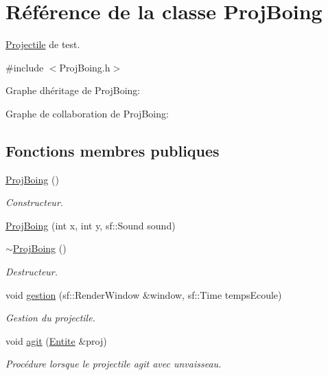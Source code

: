 \hypertarget{class_proj_boing}{}\section{Référence de la classe Proj\+Boing}
\label{class_proj_boing}


\hyperlink{class_projectile}{Projectile} de test.  




{\ttfamily \#include $<$Proj\+Boing.\+h$>$}



Graphe d\textquotesingle{}héritage de Proj\+Boing\+:


Graphe de collaboration de Proj\+Boing\+:
\subsection*{Fonctions membres publiques}
\begin{DoxyCompactItemize}
\item 
\hyperlink{class_proj_boing_aebaef3b6474750c645ccd633b03bb9ce}{Proj\+Boing} ()
\begin{DoxyCompactList}\small\item\em Constructeur. \end{DoxyCompactList}\item 
\hyperlink{class_proj_boing_ad2f963465fff3fae7aeeeda8546afe09}{Proj\+Boing} (int x, int y, sf\+::\+Sound sound)
\item 
\hyperlink{class_proj_boing_a3b5745800aa7ce95337b6e89f06d2d43}{$\sim$\+Proj\+Boing} ()
\begin{DoxyCompactList}\small\item\em Destructeur. \end{DoxyCompactList}\item 
void \hyperlink{class_proj_boing_aab0f3ea007483e26c38bd9f861954dae}{gestion} (sf\+::\+Render\+Window \&window, sf\+::\+Time temps\+Ecoule)
\begin{DoxyCompactList}\small\item\em Gestion du projectile. \end{DoxyCompactList}\item 
void \hyperlink{class_proj_boing_acbee1a0aa00582682ce755e1b19d687a}{agit} (\hyperlink{class_entite}{Entite} \&proj)
\begin{DoxyCompactList}\small\item\em Procédure lorsque le projectile agit avec unvaisseau. \end{DoxyCompactList}\end{DoxyCompactItemize}
